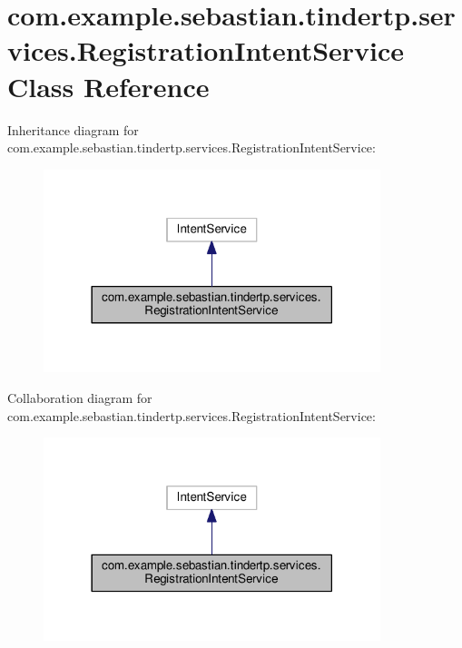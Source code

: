 \hypertarget{classcom_1_1example_1_1sebastian_1_1tindertp_1_1services_1_1RegistrationIntentService}{}\section{com.\+example.\+sebastian.\+tindertp.\+services.\+Registration\+Intent\+Service Class Reference}
\label{classcom_1_1example_1_1sebastian_1_1tindertp_1_1services_1_1RegistrationIntentService}


Inheritance diagram for com.\+example.\+sebastian.\+tindertp.\+services.\+Registration\+Intent\+Service\+:\nopagebreak
\begin{figure}[H]
\begin{center}
\leavevmode
\includegraphics[width=278pt]{classcom_1_1example_1_1sebastian_1_1tindertp_1_1services_1_1RegistrationIntentService__inherit__graph}
\end{center}
\end{figure}


Collaboration diagram for com.\+example.\+sebastian.\+tindertp.\+services.\+Registration\+Intent\+Service\+:\nopagebreak
\begin{figure}[H]
\begin{center}
\leavevmode
\includegraphics[width=278pt]{classcom_1_1example_1_1sebastian_1_1tindertp_1_1services_1_1RegistrationIntentService__coll__graph}
\end{center}
\end{figure}
